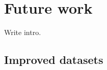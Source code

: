 \chapter{Future work}
\label{ch:future_work}

Write intro.

\section{Improved datasets}
\label{sec:improved_datasets} %


